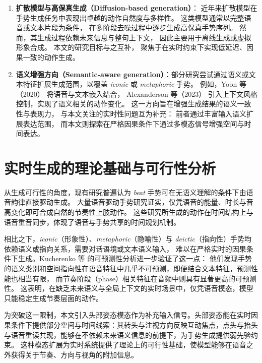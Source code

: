 \begin{enumerate}
  \item \textbf{扩散模型与高保真生成（Diffusion-based generation）}：
  近年来扩散模型在手势生成任务中表现出卓越的动作自然度与多样性\cite{diffsheg,diffstylegesture,DiffTED2024,tamingDiffgesture,alexanderson2023diffgesture}。
  这类模型通常以完整语音或文本片段为条件，%
  在多阶段去噪过程中逐步生成高保真手势序列。
  然而，其生成过程依赖未来信息与整句上下文，
  因此主要用于离线生成或虚拟形象合成。
  本文的研究目标与之互补，%
  聚焦于在实时约束下实现低延迟、因果一致的动作生成。%

  \item \textbf{语义增强方向（Semantic-aware generation）}：部分研究尝试通过语义或文本特征扩展生成范围，以覆盖 \emph{iconic} 或 \emph{metaphoric} 手势。
  例如，Yoon 等（2020）\cite{yoon2020speechgesturebert} 将语音与文本嵌入结合，
  Alexanderson 等（2023）\cite{alexanderson2023diffgesture} 引入上下文风格控制，实现了语义相关的动作变化。
  这一方向旨在增强生成结果的语义一致性与表现力，%
  与本文关注的实时性问题互为补充：%
  前者通过丰富输入语义扩展表达范围，%
  而本文则探索在严格因果条件下通过多模态信号增强空间与时间表达。
\end{enumerate}

\section{实时生成的理论基础与可行性分析}
从生成可行性的角度，现有研究普遍认为 \emph{beat} 手势可在无语义理解的条件下由语音韵律直接驱动生成。
大量语音驱动手势研究证实，仅凭语音的能量、时长与音高变化即可合成自然的节奏性上肢动作\cite{ginosar2019speech2gesture,alexanderson2020stylegestures,kucherenko2021movingfastslow}。
这些研究所生成的动作在时间结构上与语音重音同步，体现了语音与手势共享的时间规划机制。

相比之下，\emph{iconic}（形象性）、\emph{metaphoric}（隐喻性）与 \emph{deictic}（指向性）手势均依赖语义或指向关系，需要对话语境或文本语义输入，
难以在严格实时的因果条件下生成。Kucherenko 等\cite{kucherenko2021predictability} 的可预测性分析进一步验证了这一点：
他们发现手势的语义类别和空间指向性在语音特征中几乎不可预测，即便结合文本特征，预测性能也相当有限，
而节奏阶段（phase）相关特征在音频中则具有显著更高的可预测性。
这表明，在缺乏未来语义与全局上下文的实时场景中，仅凭语音模态，模型只能稳定生成节奏层面的动作。

为突破这一限制，本文引入头部姿态模态作为补充输入信号。头部姿态能在实时因果条件下提供部分空间与时间线索：其转头与注视方向反映互动焦点，点头与抬头与语音重读共现，能够在不依赖未来语义信息的前提下，为手势生成提供弱先验约束。
这种模态扩展为实时系统提供了理论上的可行性基础，使模型能够在语音之外获得关于节奏、方向与视角的附加信息。

